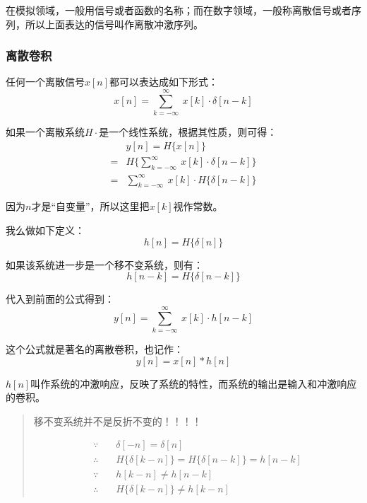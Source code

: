 在模拟领域，一般用信号或者函数的名称；而在数字领域，一般称离散信号或者序列，所以上面表达的信号叫作离散冲激序列。
\subsubsection{离散卷积}
任何一个离散信号$x[n]$都可以表达成如下形式：
\begin{equation}
	x[n]=\sum\limits_{k=-\infty}^\infty\ x[k]\cdot \delta[n-k]
\end{equation}

如果一个离散系统$H{\cdot}$是一个线性系统，根据其性质，则可得：
\begin{equation}
	\begin{aligned}
		  & y[n]=H\{x[n]\}                                             \\
		= & H\{\sum\limits_{k=-\infty}^\infty\ x[k]\cdot \delta[n-k]\} \\
		= & \sum\limits_{k=-\infty}^\infty\ x[k]\cdot H\{\delta[n-k]\}
	\end{aligned}
\end{equation}

因为$n$才是“自变量”，所以这里把$x[k]$视作常数。

我么做如下定义：
\begin{equation}
	h[n]=H\{\delta[n]\}
\end{equation}

如果该系统进一步是一个移不变系统，则有：
\begin{equation}
	h[n-k]=H\{\delta[n-k]\}
\end{equation}

代入到前面的公式得到：
\begin{equation}
	y[n]=\sum\limits_{k=-\infty}^\infty\ x[k]\cdot h[n-k]
\end{equation}

这个公式就是著名的离散卷积，也记作：
\begin{equation}
	y[n]=x[n]*h[n]
\end{equation}

$h[n]$叫作系统的冲激响应，反映了系统的特性，而系统的输出是输入和冲激响应的卷积。

\begin{quote}
	移不变系统并不是反折不变的！！！！

	\begin{align*}
		\because   & \quad \delta[-n]=\delta[n]                     \\
		\therefore & \quad H\{\delta[k-n]\}=H\{\delta[n-k]\}=h[n-k] \\
		\because   & \quad h[k-n]\neq h[n-k]                        \\
		\therefore & \quad H\{\delta[k-n]\}\neq h[k-n]
	\end{align*}
\end{quote}
